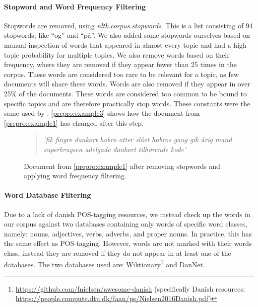 \paragraph{Stopword and Word Frequency Filtering}
Stopwords are removed, using \emph{nltk.corpus.stopwords}. 
This is a list consisting of 94 stopwords, like ``og'' and ``på''.
We also added some stopwords ourselves based on manual inspection of words that appeared in almost every topic and had a high topic probability for multiple topics.
We also remove words based on their frequency, where they are removed if they appear fewer than 25 times in the corpus.
These words are considered too rare to be relevant for a topic, as few documents will share these words.
Words are also removed if they appear in over 25\% of the documents.
These words are considered too common to be bound to specific topics and are therefore practically stop words.
These constants were the same used by \cite{quanti}.
\autoref{prepro:example3} shows how the document from \autoref{prepro:example1} has changed after this step.
\begin{figure}[h]
	\begin{framed}
		\begin{quote}
			\textit{
				'fik fingre dankort hobro atter slået hobros gang gik årig mand superbrugsen adelgade dankort tilhørende kode'
			}
		\end{quote}
	\end{framed}
	\caption{Document from \autoref{prepro:example1} after removing stopwords and applying word frequency filtering.}
	\label{prepro:example3}
\end{figure}


\paragraph{Word Database Filtering}
Due to a lack of danish POS-tagging resources, we instead check up the words in our corpus against two databases containing only words of specific word classes, namely: nouns, adjectives, verbs, adverbs, and proper nouns.
In practice, this has the same effect as POS-tagging.
However, words are not marked with their words class, instead they are removed if they do not appear in at least one of the databases.
The two databases used are:  Wiktionary\footnote{\url{https://github.com/fnielsen/awesome-danish} (specifically Danish resources: \url{https://people.compute.dtu.dk/faan/ps/Nielsen2016Danish.pdf})} and DanNet\cite{Pedersen2009DanNetTC}. 

